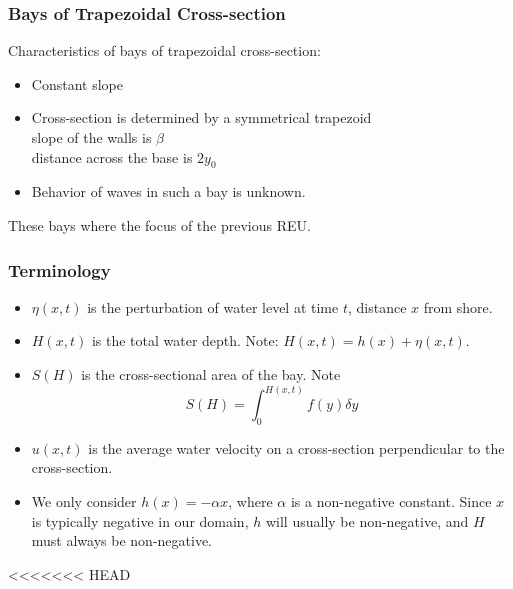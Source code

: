 
	\begin{frame}
		\frametitle{Bays of Trapezoidal Cross-section}
		Characteristics of bays of trapezoidal cross-section:
		\begin{itemize}
			\item Constant slope
			\item Cross-section is determined by a symmetrical trapezoid\\
			slope of the walls is $\beta$\\
			distance across the base is $2 y_0$
			\item Behavior of waves in such a bay is unknown. 
		\end{itemize}
		These bays where the focus of the previous REU.
	\end{frame}

	\begin{frame}
		\frametitle{Terminology}
		\begin{itemize}
			\item $\eta(x,t)$ is the perturbation of water level at time $t$, distance $x$ from shore.
			\item $H(x,t)$ is the total water depth. Note: $H(x,t) = h(x) + \eta(x,t)$.
			\item $S(H)$ is the cross-sectional area of the bay. Note
				\[ S(H) = \int_0^{H(x,t)} f(y) \delta y \]
			\item $u(x,t)$ is the average water velocity on a cross-section perpendicular to the cross-section.
			\item We only consider $h(x) = -\alpha x$, where $\alpha$ is a non-negative constant. Since $x$ is typically negative in our domain, $h$ will usually be non-negative, and $H$ must always be non-negative.
		\end{itemize}
	\end{frame}
<<<<<<< HEAD

